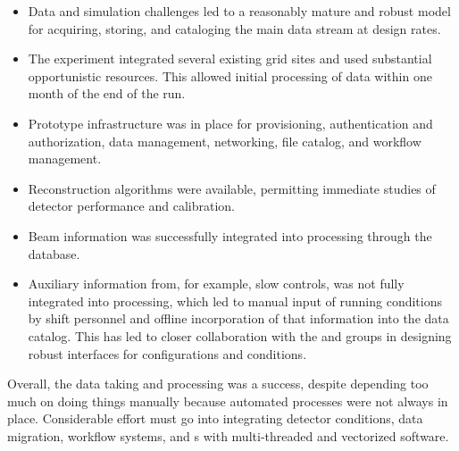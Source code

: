 \begin{itemize}
    \item Data and simulation challenges led to a reasonably mature and robust model for acquiring, storing, and cataloging the main data stream at design rates.
    \item The experiment integrated several existing grid sites and used substantial opportunistic resources.  This allowed initial processing of data within one month of the end of the run.
    \item Prototype infrastructure was in place for provisioning, authentication and authorization, data management, networking, file catalog, and workflow management. 
    \item Reconstruction algorithms were available, permitting immediate studies of detector performance and calibration. 
    \item Beam information was successfully integrated into processing through the  database.
    \item Auxiliary information from, for example, slow controls, was not fully integrated into processing, which led to  manual input of running conditions by shift personnel and offline incorporation of that information into the data catalog. This has led to closer collaboration with the  and  groups in designing robust interfaces for configurations and conditions. 
\end{itemize}

Overall, the  data taking and processing was a success, despite depending too much on doing things manually because automated processes were not always in place. Considerable effort must go into integrating detector conditions, data migration, workflow systems, and s with multi-threaded and vectorized software.



